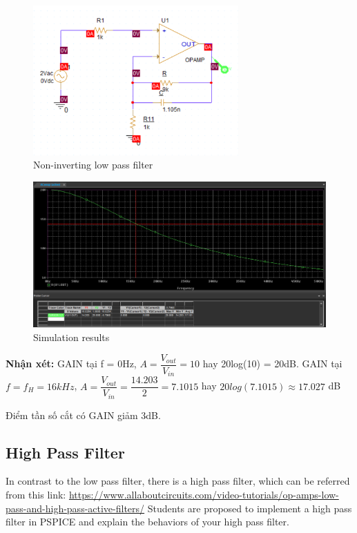 \begin{figure}[ht]
    \centering
    \includegraphics[width=0.7\textwidth]{graphics/ex1/f19.png}
    \caption{Non-inverting low pass filter}
\end{figure}
\pagebreak
\begin{figure}[ht]
    \centering
    \includegraphics[width=1\textwidth]{graphics/ex1/f20.png}
    \caption{Simulation results}
\end{figure}

\textbf{Nhận xét:} GAIN tại f = 0Hz, $A = \dfrac{V_{out}}{V_{in}} = 10$ hay 20log(10) = 20dB. GAIN tại $f = f_{H} = 16kHz$, $A = \dfrac{V_{out}}{V_{in}} = \dfrac{14.203}{2} = 7.1015$ hay $20log(7.1015) \approx 17.027$ dB

Điểm tần số cắt có GAIN giảm 3dB.

\subsection{High Pass Filter}
In contrast to the low pass filter, there is a high pass filter, which can be referred from this
link:
\url{https://www.allaboutcircuits.com/video-tutorials/op-amps-low-pass-and-high-pass-active-filters/}
Students are proposed to implement a high pass filter in PSPICE and explain the behaviors
of your high pass filter.

